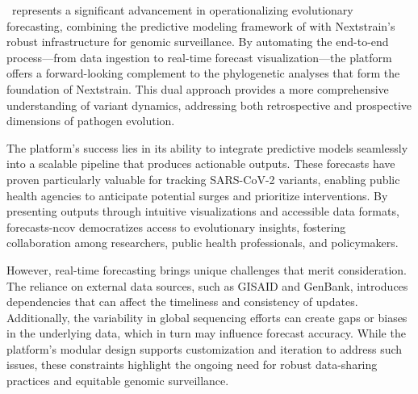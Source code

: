 %
%

\forecastsNcov\ represents a significant advancement in operationalizing evolutionary forecasting, combining the predictive modeling framework of \evofr with Nextstrain’s robust infrastructure for genomic surveillance.
By automating the end-to-end process—from data ingestion to real-time forecast visualization—the platform offers a forward-looking complement to the phylogenetic analyses that form the foundation of Nextstrain.
This dual approach provides a more comprehensive understanding of variant dynamics, addressing both retrospective and prospective dimensions of pathogen evolution.

The platform’s success lies in its ability to integrate predictive models seamlessly into a scalable pipeline that produces actionable outputs.
These forecasts have proven particularly valuable for tracking SARS-CoV-2 variants, enabling public health agencies to anticipate potential surges and prioritize interventions.
By presenting outputs through intuitive visualizations and accessible data formats, forecasts-ncov democratizes access to evolutionary insights, fostering collaboration among researchers, public health professionals, and policymakers.

However, real-time forecasting brings unique challenges that merit consideration.
The reliance on external data sources, such as GISAID and GenBank, introduces dependencies that can affect the timeliness and consistency of updates.
Additionally, the variability in global sequencing efforts can create gaps or biases in the underlying data, which in turn may influence forecast accuracy.
While the platform’s modular design supports customization and iteration to address such issues, these constraints highlight the ongoing need for robust data-sharing practices and equitable genomic surveillance.

